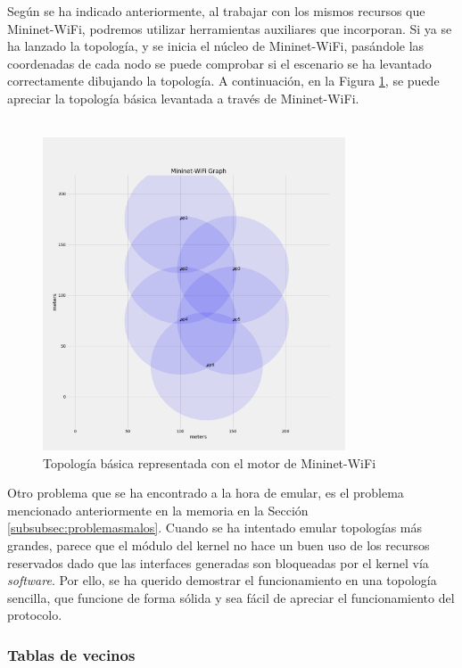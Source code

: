 Según se ha indicado anteriormente, al trabajar con los mismos recursos que Mininet-WiFi, podremos utilizar herramientas auxiliares que incorporan. Si ya se ha lanzado la topología, y se inicia el núcleo de Mininet-WiFi, pasándole las coordenadas de cada nodo se puede comprobar si el escenario se ha levantado correctamente dibujando la topología. A continuación, en la Figura \ref{fig:topo_val_mininetWifi}, se puede apreciar la topología básica levantada a través de Mininet-WiFi.\\
\\

\begin{figure}[ht]
    \centering
    \includegraphics[width=0.8\textwidth]{archivos/img/dev/topo_val_mininetWifi.png}
    \caption{Topología básica representada con el motor de Mininet-WiFi}
    \label{fig:topo_val_mininetWifi}
\end{figure}

Otro problema que se ha encontrado a la hora de emular, es el problema mencionado anteriormente en la memoria en la Sección \ref{subsubsec:problemasmalos}. Cuando se ha intentado emular topologías más grandes, parece que el módulo del kernel no hace un buen uso de los recursos reservados dado que las interfaces generadas son bloqueadas por el kernel vía \textit{software}. Por ello, se ha querido demostrar el funcionamiento en una topología sencilla, que funcione de forma sólida y sea fácil de apreciar el funcionamiento del protocolo.

\subsubsection{Tablas de vecinos}

